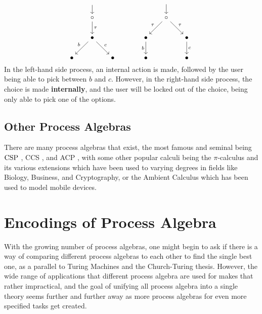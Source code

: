 \documentclass[../hons_project.tex]{subfiles}
\begin{document}
\[\begin{tikzcd}[cramped, column sep=scriptsize]
	& {} &&&& {} \\
	& \circ &&&& \circ \\
	& \bullet &&& \bullet && \bullet \\
	\bullet && \bullet && \bullet && \bullet
	\arrow[shorten <=5pt, from=1-2, to=2-2]
	\arrow[shorten <=4pt, from=1-6, to=2-6]
	\arrow["\tau", from=2-2, to=3-2]
	\arrow["\tau"', from=2-6, to=3-5]
	\arrow["\tau", from=2-6, to=3-7]
	\arrow["b"', from=3-2, to=4-1]
	\arrow["c", from=3-2, to=4-3]
	\arrow["b"', from=3-5, to=4-5]
	\arrow["c", from=3-7, to=4-7]
\end{tikzcd}\]
In the left-hand side process, an internal action is made, followed by the user being able to pick between $b$ and $c$. However, in the right-hand side process, the choice is made \textbf{internally}, and the user will be locked out of the choice, being only able to pick one of the options.

\subsection{Other Process Algebras}
There are many process algebras that exist, the most famous and seminal being $\mathrm{CSP}$ \citep{brookesTheoryCommunicatingSequential1984}, CCS \citep{milnerCalculusCommunicatingSystems1980}, and ACP \citep{bergstraProcessAlgebraSynchronous1984, bergstraACPtUniversalAxiom1989}, with some other popular calculi being the $\pi$-calculus and its various extensions  \citep{MILNER19921, parrowFusionCalculusExpressiveness1998, abadiCalculusCryptographicProtocols1999} which have been used to varying degrees in fields like Biology, Business, and Cryptography, or the Ambient Calculus \citep{cardelliMobileAmbients1998} which has been used to model mobile devices.

\section{Encodings of Process Algebra}

With the growing number of process algebras, one might begin to ask if there is a way of comparing different process algebras to each other to find the single best one, as a parallel to Turing Machines and the Church-Turing thesis. However, the wide range of applications that different process algebra are used for makes that rather impractical, and the goal of unifying all process algebra into a single theory seems further and further away as more process algebras for even more specified tasks get created.
\end{document}
